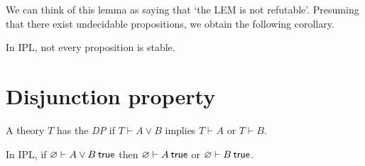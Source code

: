 \documentclass[12pt]{article}
\newenvironment{theorem}[1][Theorem.]{\begin{trivlist}\item[\hskip \labelsep {\bfseries #1}]}{\end{trivlist}}
\newenvironment{corollary}[1][Corollary.]{\begin{trivlist}\item[\hskip \labelsep {\bfseries #1}]}{\end{trivlist}}
\begin{document}
We can think of this lemma as saying that `the \acl{LEM} is not refutable'. Presuming that there exist undecidable propositions, we obtain the following corollary.

\begin{corollary}
In \acl{IPL}, not every proposition is stable.
\end{corollary}

\section{Disjunction property}
A theory $T$ has the \emph{\ac{DP}} if $T \vdash A \vee B$ implies $T \vdash A$ or $T \vdash B$.

\begin{theorem} \label{thm:dp}
In \acs{IPL}, if $\varnothing \vdash A \disj B \true$ then $\varnothing \vdash A \true$ or $\varnothing \vdash B \true$.
\end{theorem}
\end{document}
